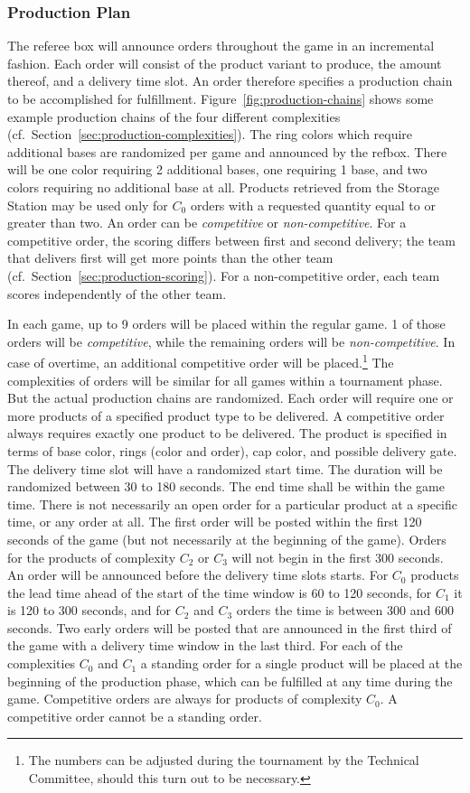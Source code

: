 \documentclass[12pt,twoside]{article}
\newcommand{\refsec}[1]{Section~\ref{#1}}
\newcommand{\reffig}[1]{Figure~\ref{#1}}
\begin{document}
\subsubsection{Production Plan}
\label{sec:production-plan}
The referee box will announce orders throughout the game in an
incremental fashion. Each order will consist of the product variant to
produce, the amount thereof, and a delivery time slot. An order
therefore specifies a production chain to be accomplished for
fulfillment. \reffig{fig:production-chains} shows some example
production chains of the four different complexities
(cf.~\refsec{sec:production-complexities}). The ring colors which
require additional bases are randomized per game and announced by the
refbox. There will be one color requiring 2 additional bases, one
requiring 1 base, and two colors requiring no additional base at
all. Products retrieved from the Storage Station may be used only for
$C_0$ orders with a requested quantity equal to or greater than two.
An order can be \emph{competitive} or \emph{non-competitive}. For a competitive
order, the scoring differs between first and second delivery; the team that
delivers first will get more points than the other team
(cf.~\refsec{sec:production-scoring}). For a non-competitive order, each team
scores independently of the other team.

In each game, up to 9 orders will be placed within the regular game.
1 of those orders will be \emph{competitive}, while the remaining
orders will be \emph{non-competitive}. In case of overtime, an
additional competitive order will be placed.\footnote{The numbers can
be adjusted during the tournament by the Technical Committee, should
this turn out to be necessary.}
The complexities of orders will be similar for all games within a
tournament phase. But the actual production chains are randomized.
Each order will require one or more products of a specified product
type to be delivered. A competitive order always requires exactly one
product to be delivered. The product is specified in terms of base
color, rings (color and order), cap color, and possible delivery gate.
The delivery time slot will have a randomized start time. The duration
will be randomized between 30 to 180 seconds. The end time shall be
within the game time. There is not necessarily an open order for a
particular product at a specific time, or any order at all. The first
order will be posted within the first 120 seconds of the game (but not
necessarily at the beginning of the game). Orders for the products of
complexity $C_2$ or $C_3$ will not begin in the first 300 seconds. An
order will be announced before the delivery time slots starts. For
$C_0$ products the lead time ahead of the start of the time window is
60 to 120 seconds, for $C_1$ it is 120 to 300 seconds, and for $C_2$
and $C_3$ orders the time is between 300 and 600 seconds. Two early
orders will be posted that are announced in the first third of the
game with a delivery time window in the last third. For each of the
complexities $C_0$ and $C_1$ a standing order for a single product
will be placed at the beginning of the production phase, which can be
fulfilled at any time during the game. Competitive orders are always for
products of complexity $C_0$. A competitive order cannot be a standing order.
\end{document}
